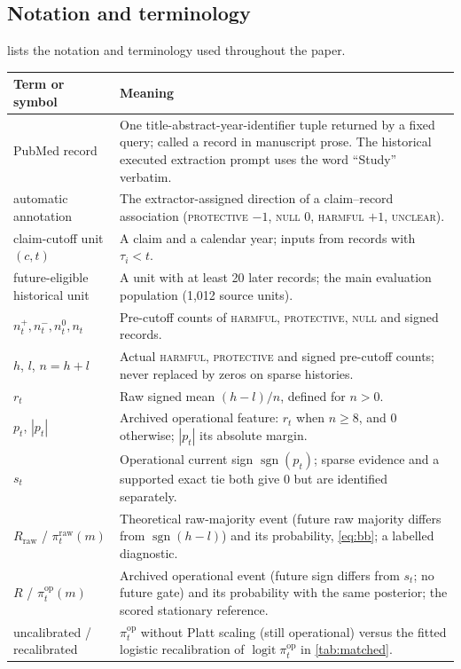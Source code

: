 \documentclass[11pt]{article}
\newcommand{\sgn}{\operatorname{sgn}}
\DeclareMathOperator{\logit}{logit}
\begin{document}
\subsection{Notation and terminology}
\label{app:notation}
 lists the notation and terminology used throughout the paper.
\begin{table}[!t]\centering\scriptsize
\setlength{\tabcolsep}{3pt}
\begin{tabular}{@{}p{}p{}@{}}
\toprule
Term or symbol & Meaning \\
\midrule
PubMed record & One title-abstract-year-identifier tuple returned by a fixed query; called a record in manuscript prose. The historical executed extraction prompt uses the word ``Study'' verbatim. \\
automatic annotation & The extractor-assigned direction of a claim–record association (\textsc{protective} $-1$, \textsc{null} $0$, \textsc{harmful} $+1$, \textsc{unclear}). \\
claim-cutoff unit $(c,t)$ & A claim and a calendar year; inputs from records with $\tau_i<t$. \\
future-eligible historical unit & A unit with at least 20 later records; the main evaluation population (1{,}012 source units). \\
$n^{+}_t,n^{-}_t,n^{0}_t,n_t$ & Pre-cutoff counts of \textsc{harmful}, \textsc{protective}, \textsc{null} and signed records. \\
$h$, $l$, $n=h+l$ & Actual \textsc{harmful}, \textsc{protective} and signed pre-cutoff counts; never replaced by zeros on sparse histories. \\
$r_t$ & Raw signed mean $(h-l)/n$, defined for $n>0$. \\
$p_t$, $|p_t|$ & Archived operational feature: $r_t$ when $n\ge8$, and 0 otherwise; $|p_t|$ its absolute margin. \\
$s_t$ & Operational current sign $\sgn(p_t)$; sparse evidence and a supported exact tie both give 0 but are identified separately. \\
$R_{\mathrm{raw}}$ / $\pi^{\mathrm{raw}}_t(m)$ & Theoretical raw-majority event (future raw majority differs from $\sgn(h-l)$) and its probability, \cref{eq:bb}; a labelled diagnostic. \\
$R$ / $\pi^{\mathrm{op}}_t(m)$ & Archived operational event (future sign differs from $s_t$; no future gate) and its probability with the same posterior; the scored stationary reference. \\
uncalibrated / recalibrated & $\pi^{\mathrm{op}}_t$ without Platt scaling (still operational) versus the fitted logistic recalibration of $\logit\pi^{\mathrm{op}}_t$ in \cref{tab:matched}. \\

\end{tabular}
\end{table}
\end{document}

